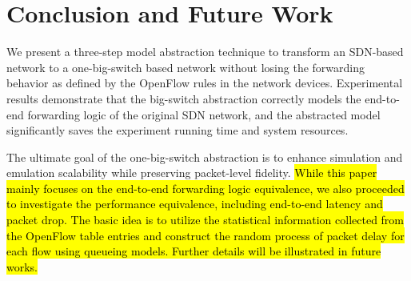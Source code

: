 \section{Conclusion and Future Work}
\label{Sec:conclusion}

We present a three-step model abstraction technique to transform an SDN-based network to a one-big-switch based network without losing the forwarding behavior as defined by the OpenFlow rules in the network devices.
Experimental results demonstrate that the big-switch abstraction correctly models the end-to-end forwarding logic of the original SDN network, and the abstracted model significantly saves the experiment running time and system resources. 

The ultimate goal of the one-big-switch abstraction is to enhance simulation and emulation scalability while preserving packet-level fidelity. \hl{While this paper mainly focuses on the end-to-end forwarding logic equivalence, we also proceeded to investigate the performance equivalence, including end-to-end latency and packet drop. The basic idea is to utilize the statistical information collected from the OpenFlow table entries and construct the random process of packet delay for each flow using queueing models. Further details will be illustrated in future works.}
